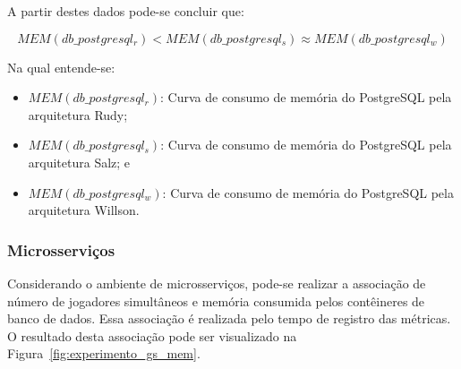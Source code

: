 A partir destes dados pode-se concluir que:

$$
    MEM(db\_postgresql_{r}) < MEM(db\_postgresql_{s}) \approx MEM(db\_postgresql_{w})
$$

Na qual entende-se:

\begin{itemize}
\item $MEM(db\_postgresql_{r})$: Curva de consumo de memória do PostgreSQL pela arquitetura Rudy;
\item $MEM(db\_postgresql_{s})$: Curva de consumo de memória do PostgreSQL pela arquitetura Salz; e
\item $MEM(db\_postgresql_{w})$: Curva de consumo de memória do PostgreSQL pela arquitetura Willson.
\end{itemize}


\subsubsection{Microsserviços}

Considerando o ambiente de microsserviços, pode-se realizar a associação de número de jogadores simultâneos e memória consumida pelos contêineres de banco de dados.
%
Essa associação é realizada pelo tempo de registro das métricas.
%
O resultado desta associação pode ser visualizado na Figura~\ref{fig:experimento_gs_mem}.



